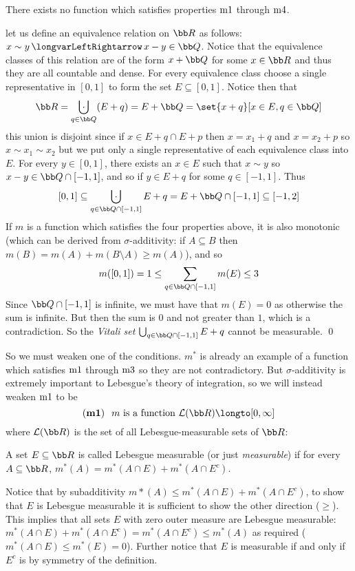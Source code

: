 \bprop[title=The Vitali Set]

    There exists no function which satisfies properties $\rm m1$ through $\rm m4$.

\eprop

\Proof let us define an equivalence relation on ${\bb R}$ as follows: $x\sim y\iff x-y\in{\bb Q}$.
Notice that the equivalence classes of this relation are of the form $x+{\bb Q}$ for some $x\in{\bb R}$ and thus they are all countable and dense.
For every equivalence class choose a single representative in $[0,1]$ to form the set $E\subseteq[0,1]$.
Notice then that
$$ {\bb R} = \bigdcup_{q\in{\bb Q}}(E+q) = E+{\bb Q} = \set{x+q}[x\in E,q\in{\bb Q}] $$
this union is disjoint since if $x\in E+q\cap E+p$ then $x=x_1+q$ and $x=x_2+p$ so $x\sim x_1\sim x_2$ but we put only a single representative of each equivalence class into $E$.
For every $y\in[0,1]$, there exists an $x\in E$ such that $x\sim y$ so $x-y\in{\bb Q}\cap[-1,1]$, and so if $y\in E+q$ for some $q\in[-1,1]$.
Thus
$$ [0,1] \subseteq \bigdcup_{q\in{\bb Q}\cap[-1,1]}E+q = E + {\bb Q}\cap[-1,1] \subseteq [-1,2] $$
If $m$ is a function which satisfies the four properties above, it is also monotonic (which can be derived from $\sigma$-additivity: if $A\subseteq B$ then $m(B)=m(A)+m(B\setminus A)\geq m(A)$), and so
$$ m([0,1]) = 1 \leq \sum_{q\in{\bb Q}\cap[-1,1]}m(E) \leq 3 $$
Since ${\bb Q}\cap[-1,1]$ is infinite, we must have that $m(E)=0$ as otherwise the sum is infinite.
But then the sum is $0$ and not greater than $1$, which is a contradiction.
So the {\it Vitali set\/} $\bigcup_{q\in{\bb Q}\cap[-1,1]}E+q$ cannot be measurable.
\qed

So we must weaken one of the conditions.
$m^*$ is already an example of a function which satisfies $\rm m1$ through $\rm m3$ so they are not contradictory.
But $\sigma$-additivity is extremely important to Lebesgue's theory of integration, so we will instead weaken $\rm m1$ to be
$$ \hbox{$({\bf m1})$\kern.25cm $m$ is a function ${\cal L}({\bb R})\longto[0,\infty]$} $$
where ${\cal L}({\bb R})$ is the set of all Lebesgue-measurable sets of ${\bb R}$:

\bdefn[title=Carath\'eodory]

    A set $E\subseteq{\bb R}$ is called {\emphcolor Lebesgue measurable} (or just {\it measurable}) if for every $A\subseteq{\bb R}$, $m^*(A)=m^*(A\cap E)+m^*(A\cap E^c)$.

\edefn

Notice that by subadditivity $m*(A)\leq m^*(A\cap E)+m^*(A\cap E^c)$, to show that $E$ is Lebesgue measurable it is sufficient to show the other direction ($\geq$).
This implies that all sets $E$ with zero outer measure are Lebesgue measurable: $m^*(A\cap E)+m^*(A\cap E^c)=m^*(A\cap E^c)\leq m^*(A)$ as required ($m^*(A\cap E)\leq m^*(E)=0$).
Further notice that $E$ is measurable if and only if $E^c$ is by symmetry of the definition.

